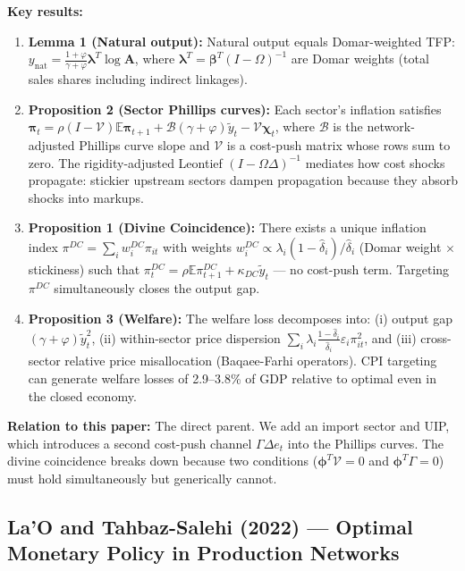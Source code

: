 \documentclass[12pt]{article}
\begin{document}
\textbf{Key results:}
\begin{enumerate}
    \item \textbf{Lemma 1 (Natural output):} Natural output equals Domar-weighted TFP: $y_{\mathrm{nat}} = \frac{1+\varphi}{\gamma+\varphi}\bm{\lambda}^T\log\mathbf{A}$, where $\bm{\lambda}^T = \bm{\beta}^T(I-\Omega)^{-1}$ are Domar weights (total sales shares including indirect linkages).
    \item \textbf{Proposition 2 (Sector Phillips curves):} Each sector's inflation satisfies $\bm{\pi}_t = \rho(I-\mathcal{V})\mathbb{E}\bm{\pi}_{t+1} + \mathcal{B}(\gamma+\varphi)\tilde{y}_t - \mathcal{V}\bm{\chi}_t$, where $\mathcal{B}$ is the network-adjusted Phillips curve slope and $\mathcal{V}$ is a cost-push matrix whose rows sum to zero. The rigidity-adjusted Leontief $(I-\Omega\Delta)^{-1}$ mediates how cost shocks propagate: stickier upstream sectors dampen propagation because they absorb shocks into markups.
    \item \textbf{Proposition 1 (Divine Coincidence):} There exists a unique inflation index $\pi^{DC} = \sum_i w_i^{DC}\pi_{it}$ with weights $w_i^{DC} \propto \lambda_i(1-\hat{\delta}_i)/\hat{\delta}_i$ (Domar weight $\times$ stickiness) such that $\pi_t^{DC} = \rho\mathbb{E}\pi_{t+1}^{DC} + \kappa_{DC}\tilde{y}_t$ --- no cost-push term. Targeting $\pi^{DC}$ simultaneously closes the output gap.
    \item \textbf{Proposition 3 (Welfare):} The welfare loss decomposes into: (i) output gap $(\gamma+\varphi)\tilde{y}_t^2$, (ii) within-sector price dispersion $\sum_i \lambda_i\frac{1-\hat{\delta}_i}{\hat{\delta}_i}\varepsilon_i\pi_{it}^2$, and (iii) cross-sector relative price misallocation (Baqaee-Farhi operators). CPI targeting can generate welfare losses of 2.9--3.8\% of GDP relative to optimal even in the closed economy.
\end{enumerate}

\textbf{Relation to this paper:} The direct parent. We add an import sector and UIP, which introduces a second cost-push channel $\Gamma\Delta e_t$ into the Phillips curves. The divine coincidence breaks down because two conditions ($\bm{\phi}^T\mathcal{V}=0$ and $\bm{\phi}^T\Gamma=0$) must hold simultaneously but generically cannot.

\subsection{La'O and Tahbaz-Salehi (2022) --- Optimal Monetary Policy in Production Networks}
\end{document}
